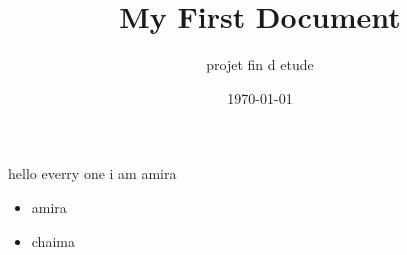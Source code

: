 \documentclass[12]{article}
\title{My First Document}
\author{projet fin d etude}
\date{\today}
\begin{document}
hello everry one i am amira
   \begin{itemize}
     \item amira 
     \item chaima 
   \end{itemize}
\end{document}
